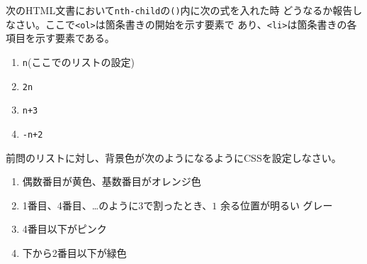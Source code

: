 \begin{Prob}\upshape\label{nth-child}
次のHTML文書において\texttt{nth-child}の\texttt{()}内に次の式を入れた時
 どうなるか報告しなさい。ここで\texttt{<ol>}は箇条書きの開始を示す要素で
 あり、\texttt{<li>}は箇条書きの各項目を示す要素である。
\begin{enumerate}
 \item \texttt{n}(ここでのリストの設定)
 \item \texttt{2n}
 \item \texttt{n+3}
 \item \texttt{-n+2}
\end{enumerate}
\end{Prob}
\begin{Prob}\upshape
前問のリストに対し、背景色が次のようになるようにCSSを設定しなさい。
\begin{enumerate}
 \item 偶数番目が黄色、基数番目がオレンジ色
 \item 1番目、4番目、\dots のように$3$で割ったとき、$1$ 余る位置が明るい
       グレー
 \item 4番目以下がピンク
 \item 下から2番目以下が緑色
\end{enumerate}
\end{Prob}